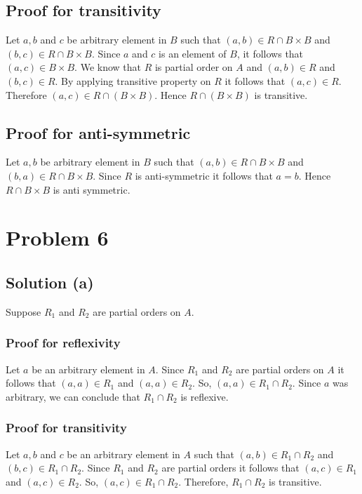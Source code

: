 \documentclass{article}
\begin{document}
\subsection{Proof for transitivity}

Let $a,b$ and $c$ be arbitrary element in $B$ such that $(a,b) \in R
\cap B \times B$ and $(b,c) \in R \cap B \times B$. Since $a$ and $c$
is an element of $B$, it follows that $(a,c) \in B \times B$. We know
that $R$ is partial order on $A$ and $(a,b) \in R$ and $(b,c) \in R$.
By applying transitive property on $R$ it follows that $(a,c) \in R$.
Therefore $(a,c) \in R \cap (B \times B)$. Hence $R \cap (B \times B)$
is transitive.

\subsection{Proof for anti-symmetric}
Let $a,b$ be arbitrary element in $B$ such that $(a,b) \in R \cap B
\times B$ and $(b,a) \in R \cap B \times B$. Since $R$ is
anti-symmetric it follows that $a = b$. Hence $R \cap B \times B$ is
anti symmetric.

\section{Problem 6}
\subsection{Solution (a)}
Suppose $R_1$ and $R_2$ are partial orders on $A$.

\subsubsection{Proof for reflexivity}

Let $a$ be an arbitrary element in $A$. Since $R_1$ and $R_2$ are
partial orders on $A$ it follows that $(a,a) \in R_1$ and $(a,a) \in
R_2$. So, $(a,a) \in R_1 \cap R_2$. Since $a$ was arbitrary, we can
conclude that $R_1 \cap R_2$ is reflexive.

\subsubsection{Proof for transitivity}

Let $a,b$ and $c$ be an arbitrary element in $A$ such that $(a,b) \in
R_1 \cap R_2$ and $(b,c) \in R_1 \cap R_2$. Since $R_1$ and $R_2$ are
partial orders it follows that $(a,c) \in R_1$ and $(a,c) \in R_2$.
So, $(a,c) \in R_1 \cap R_2$. Therefore, $R_1 \cap R_2$ is transitive.
\end{document}
